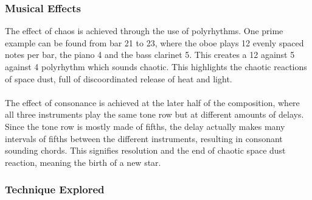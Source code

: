 \documentclass{article}
\begin{document}
\subsubsection{Musical Effects}

The effect of chaos is achieved through the use of polyrhythms. One prime example can be found from bar 21 to 23, where the oboe plays 12 evenly spaced notes per bar, the piano 4 and the bass clarinet 5. This creates a 12 against 5 against 4 polyrhythm which sounds chaotic. This highlights the chaotic reactions of space dust, full of discoordinated release of heat and light.
\\
\\
The effect of consonance is achieved at the later half of the composition, where all three instruments play the same tone row but at different amounts of delays. Since the tone row is mostly made of fifths, the delay actually makes many intervals of fifths between the different instruments, resulting in consonant sounding chords. This signifies resolution and the end of chaotic space dust reaction, meaning the birth of a new star.

\subsubsection{Technique Explored}
\end{document}
